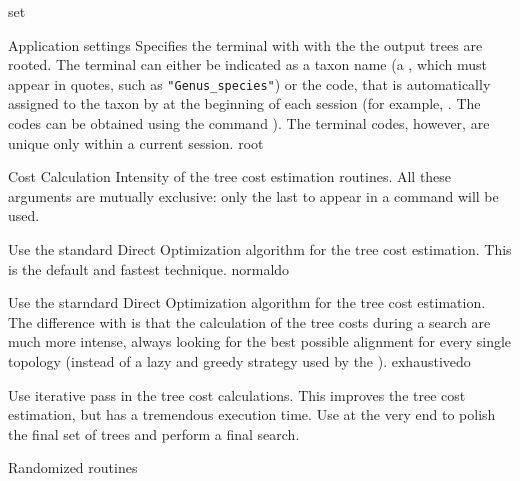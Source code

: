 \begin{command}{set}{}
\begin{arguments}
\begin{argumentgroup}{Application settings}
                {Specifies the terminal with with the the output trees are
                rooted.  The terminal can either be indicated as a taxon name (a
                \poystring, which must appear in quotes, such as
                \texttt{"Genus\_species"}) or the code, that is automatically
                assigned to the taxon by \poy at the beginning of each \poy
                session (for example, . The codes can
                be obtained using the command ).  The
                terminal codes, however, are unique only within a current
                session.}
                {root}

        \end{argumentgroup}

        \begin{argumentgroup}{Cost Calculation}
            {Intensity of the tree cost estimation routines. All these arguments
            are mutually exclusive: only the last to appear in a
             command will be used.}

                {Use the standard Direct Optimization algorithm for the tree
                cost estimation. This is the default and fastest technique.}
                {normaldo}

                {Use the starndard Direct Optimization algorithm for the tree
                cost estimation. The difference with  is
                that the calculation of the tree costs during a search are much
                more intense, always looking for the best possible alignment 
                for every single topology (instead of a lazy and greedy strategy
                used by the ).}
                {exhaustivedo}

                {Use iterative pass in the tree cost calculations. This improves
                the tree cost estimation, but has a tremendous execution time.
                Use at the very end to polish the final set of trees and perform
                a final search.}
                {}

        \end{argumentgroup}

        \begin{argumentgroup}{Randomized routines}
            {}


\end{argumentgroup}
\end{arguments}
\end{command}
